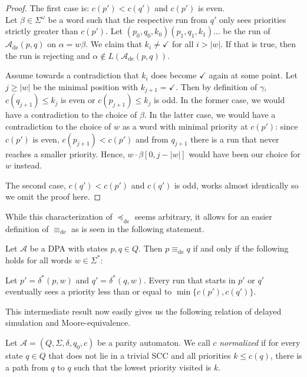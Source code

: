 \begin{proof}
	The first case is: $c(p') < c(q')$ and $c(p')$ is even. \\
	Let $\beta \in \Sigma^\omega$ be a word such that the respective run from $q'$ only sees priorities strictly greater than $c(p')$. Let $(p_0, q_0, k_0) (p_1, q_1, k_1) \dots$ be the run of $\mathcal{A}_\text{de}(p, q)$ on $\alpha = w \beta$. We claim that $k_i \neq \checkmark$ for all $i > |w|$. If that is true, then the run is rejecting and $\alpha \notin L(\mathcal{A}_\text{de}(p, q))$.
	
	Assume towards a contradiction that $k_i$ does become $\checkmark$ again at some point. Let $j \geq |w|$ be the minimal position with $k_{j+1} = \checkmark$. Then by definition of $\gamma$, $c(q_{j+1}) \leq k_j$ is even or $c(p_{j+1}) \leq k_j$ is odd. In the former case, we would have a contradiction to the choice of $\beta$. In the latter case, we would have a contradiction to the choice of $w$ as a word with minimal priority at $c(p')$: since $c(p')$ is even, $c(p_{j+1}) < c(p')$ and from $q_{j+1}$ there is a run that never reaches a smaller priority. Hence, $w \cdot \beta[0, j-|w|]$ would have been our choice for $w$ instead.
	
	The second case, $c(q') < c(p')$ and $c(q')$ is odd, works almost identically so we omit the proof here.
\end{proof}

While this characterization of $\preceq_\text{de}$ seems arbitrary, it allows for an easier definition of $\equiv_\text{de}$ as is seen in the following statement.

\begin{cor}
\label{cor:fwe:equivde_alternative}
	Let $\mathcal{A}$ be a DPA with states $p, q \in Q$. Then $p \equiv_\text{de} q$ if and only if the following holds for all words $w \in \Sigma^*$:
	
	Let $p' = \delta^*(p, w)$ and $q' = \delta^*(q, w)$. Every run that starts in $p'$ or $q'$ eventually sees a priority less than or equal to $\min \{c(p'), c(q')\}$.
\end{cor}

This intermediate result now easily gives us the following relation of delayed simulation and Moore-equivalence.

\begin{defn}
	Let $\mathcal{A} = (Q, \Sigma, \delta, q_0, c)$ be a parity automaton. We call $c$ \emph{normalized} if for every state $q \in Q$ that does not lie in a trivial SCC and all priorities $k \leq c(q)$, there is a path from $q$ to $q$ such that the lowest priority visited is $k$.
\end{defn}

